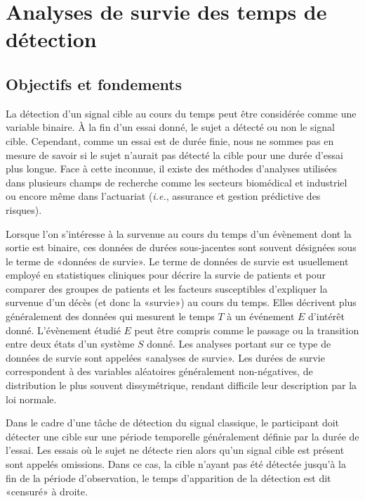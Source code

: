 \section{Analyses de survie des temps de détection}

\subsection{Objectifs et fondements}
\label{objectifsetfondements}

La détection d'un signal cible au cours du temps peut être considérée comme une variable binaire. 
À la fin d'un essai donné, le sujet a détecté ou non le signal cible. 
Cependant, comme un essai est de durée finie, nous ne sommes pas en mesure de savoir si le sujet n'aurait pas détecté la cible pour une durée d'essai plus longue. 
Face à cette inconnue, il existe des méthodes d'analyses utilisées dans plusieurs champs de recherche comme les secteurs biomédical et industriel ou encore même dans l'actuariat (\textit{i.e.}, assurance et gestion prédictive des risques). 

Lorsque l'on s'intéresse à la survenue au cours du temps d'un évènement dont la sortie est binaire, ces données de durées sous-jacentes sont souvent désignées sous le terme de «données de survie». 
Le terme de données de survie est usuellement employé en statistiques cliniques pour décrire la survie de patients et pour comparer des groupes de patients et les facteurs susceptibles d'expliquer la survenue d'un décès (et donc la «survie») au cours du temps. 
Elles décrivent plus généralement des données qui mesurent le temps $T$ à un événement $E$ d'intérêt donné. 
L'évènement étudié $E$ peut être compris comme le passage ou la transition entre deux états d'un système $S$ donné. 
Les analyses portant sur ce type de données de survie sont appelées «analyses de survie». 
Les durées de survie correspondent à des variables aléatoires généralement non-négatives, de distribution le plus souvent dissymétrique, rendant difficile leur description par la loi normale. 

Dans le cadre d'une tâche de détection du signal classique, le participant doit détecter une cible sur une période temporelle généralement définie par la durée de l'essai. 
Les essais où le sujet ne détecte rien alors qu'un signal cible est présent sont appelés omissions. 
Dans ce cas, la cible n'ayant pas été détectée jusqu'à la fin de la période d'observation, le temps d'apparition de la détection est dit «censuré» à droite.

